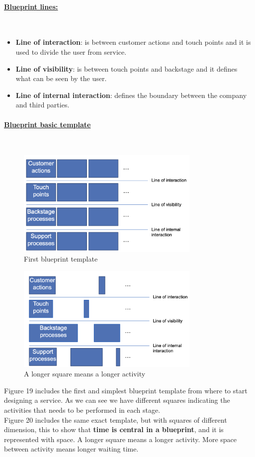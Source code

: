 \documentclass[10pt,a4paper]{article}
\newcommand{\myparagraph}[1]{\paragraph{\uline{#1}}\mbox{}\\[0.05in]}
\begin{document}
\myparagraph{Blueprint lines:}
\begin{itemize}
	\item \textbf{Line of interaction}: is between customer actions and touch points and it is used to divide the user from service.
	\item \textbf{Line of visibility}: is between touch points and backstage and it defines what can be seen by the user.
	\item \textbf{Line of internal interaction}: defines the boundary between the company and third parties.
\end{itemize}
\pagebreak
\myparagraph{Blueprint basic template}
\begin{figure}[ht!]
 \hfill \includegraphics[width=250pt]{images/blueprint-first-template}\hspace*{\fill}
 \caption{First blueprint template}
  \label{fig:first-blueprint-template}
\end{figure}
\begin{figure}[ht!]
 \hfill \includegraphics[width=250pt]{images/blueprint-time}\hspace*{\fill}
 \caption{A longer square means a longer activity}
  \label{fig:blueprint-time}
\end{figure}
Figure 19 includes the first and simplest blueprint template from where to start designing a service. As we can see we have different squares indicating the activities that needs to be performed in each stage.\\Figure 20 includes the same exact template, but with squares of different dimension, this to show that \textbf{time is central in a blueprint}, and it is represented with space. A longer square means a longer activity. More space between activity means longer waiting time.
\pagebreak
\end{document}
